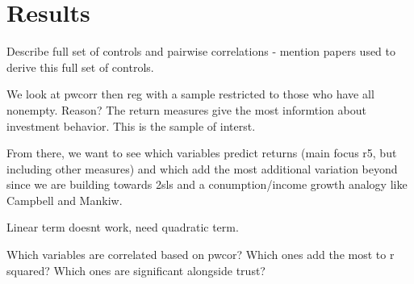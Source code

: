 \onlyinsubfile{\setcounter{section}{3}}
\section{Results}\notinsubfile{\label{sec:results}}

\par Describe full set of controls and pairwise correlations - mention papers used to derive this full set of controls.

\par We look at pwcorr then reg with a sample restricted to those who have all nonempty. Reason? The return measures give the most informtion about investment behavior. This is the sample of interst.

\par From there, we want to see which variables predict returns (main focus r5, but including other measures) and which add the most additional variation beyond since we are building towards 2sls and a conumption/income growth analogy like Campbell and Mankiw. 

\par Linear term doesnt work, need quadratic term. 

\par Which variables are correlated based on pwcor? Which ones add the most to r squared? Which ones are significant alongside trust?